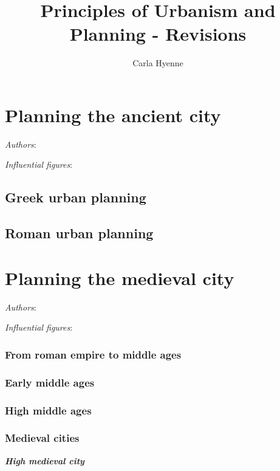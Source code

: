 \documentclass{article}
\title{Principles of Urbanism and Planning - Revisions}
\author{Carla Hyenne}
\newcommand{\bisection}[1]{\textbf{\textit{#1}}}
\begin{document}
\maketitle

\tableofcontents

\pagebreak

\section{Planning the ancient city}
\textit{Authors}:

\textit{Influential figures}:

\subsection{Greek urban planning}

\subsection{Roman urban planning}

\section{Planning the medieval city}
\textit{Authors}:

\textit{Influential figures}:

\subsubsection{From roman empire to middle ages}

\subsubsection{Early middle ages}

\subsubsection{High middle ages}

\subsubsection{Medieval cities}

\bisection{High medieval city}
\end{document}
